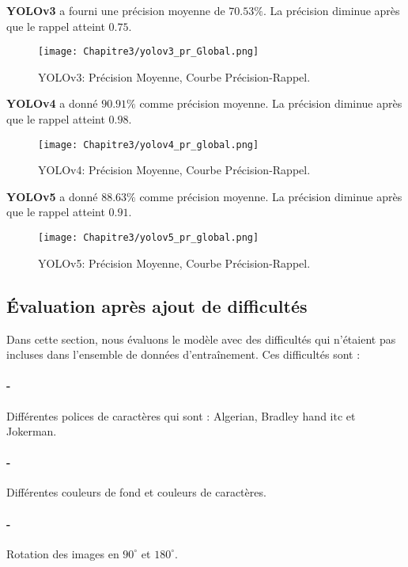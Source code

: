      \textbf{YOLOv3} a fourni une précision moyenne de $70.53\%$. La précision diminue après que le rappel atteint $0.75$.
     
     \begin{figure}[H]
               \centering
               \texttt{[image: Chapitre3/yolov3\_pr\_Global.png]}
               \caption{YOLOv3: Précision Moyenne, Courbe Précision-Rappel.}
               \label{y3_pr}
               \end{figure}

     \textbf{YOLOv4} a donné $90.91\%$ comme précision moyenne. La précision diminue après que le rappel atteint $0.98$.
     \begin{figure}[H]
               \centering
               \texttt{[image: Chapitre3/yolov4\_pr\_global.png]}
               \caption{YOLOv4: Précision Moyenne, Courbe Précision-Rappel.}
               \label{y4_pr}
               \end{figure}

     \textbf{YOLOv5} a donné $88.63\%$ comme précision moyenne. La précision diminue après que le rappel atteint $0.91$.
     \begin{figure}[H]
               \centering
               \texttt{[image: Chapitre3/yolov5\_pr\_global.png]}
               \caption{YOLOv5: Précision Moyenne, Courbe Précision-Rappel.}
               \label{y5_pr}
               \end{figure}
     
\subsection{Évaluation après ajout de difficultés}

          Dans cette section, nous évaluons le modèle avec des difficultés qui n'étaient pas incluses dans l'ensemble de données d'entraînement. Ces difficultés sont :
          \paragraph{-} Différentes polices de caractères qui sont : Algerian, Bradley hand itc et Jokerman.
          \paragraph{-} Différentes couleurs de fond et couleurs de caractères.
          \paragraph{-} Rotation des images en $90^\circ$ et $180^\circ$.
